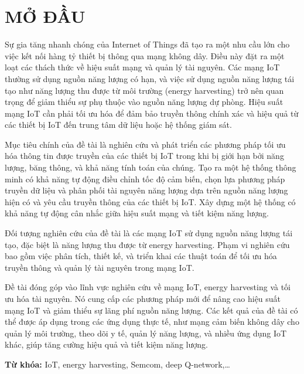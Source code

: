\section*{MỞ ĐẦU}
Sự gia tăng nhanh chóng của Internet of Things đã tạo ra một nhu cầu lớn cho việc kết nối hàng tỷ thiết bị thông qua mạng không dây. Điều này đặt ra một loạt các thách thức về hiệu suất mạng và quản lý tài nguyên. Các mạng IoT thường sử dụng nguồn năng lượng có hạn, và việc sử dụng nguồn năng lượng tái tạo như năng lượng thu được từ môi trường (energy harvesting) trở nên quan trọng để giảm thiểu sự phụ thuộc vào nguồn năng lượng dự phòng. Hiệu suất mạng IoT cần phải tối ưu hóa để đảm bảo truyền thông chính xác và hiệu quả từ các thiết bị IoT đến trung tâm dữ liệu hoặc hệ thống giám sát.

Mục tiêu chính của đề tài là nghiên cứu và phát triển các phương pháp tối ưu hóa thông tin được truyền của các thiết bị IoT trong khi bị giới hạn bởi năng lượng, băng thông, và khả năng tính toán của chúng. Tạo ra một hệ thống thông minh có khả năng tự động điều chỉnh tốc độ cảm biến, chọn lựa phương pháp truyền dữ liệu và phân phối tài nguyên năng lượng dựa trên nguồn năng lượng hiện có và yêu cầu truyền thông của các thiết bị IoT. Xây dựng một hệ thống có khả năng tự động cân nhắc giữa hiệu suất mạng và tiết kiệm năng lượng.

Đối tượng nghiên cứu của đề tài là các mạng IoT sử dụng nguồn năng lượng tái tạo, đặc biệt là năng lượng thu được từ energy harvesting. Phạm vi nghiên cứu bao gồm việc phân tích, thiết kế, và triển khai các thuật toán để tối ưu hóa truyền thông và quản lý tài nguyên trong mạng IoT.

Đề tài đóng góp vào lĩnh vực nghiên cứu về mạng IoT, energy harvesting và tối ưu hóa tài nguyên. Nó cung cấp các phương pháp mới để nâng cao hiệu suất mạng IoT và giảm thiểu sự lãng phí nguồn năng lượng. Các kết quả của đề tài có thể được áp dụng trong các ứng dụng thực tế, như mạng cảm biến không dây cho quản lý môi trường, theo dõi y tế, quản lý năng lượng, và nhiều ứng dụng IoT khác, giúp tăng cường hiệu quả và tiết kiệm năng lượng.


\textbf{Từ khóa: }IoT, energy harvesting, Semcom, deep Q-network,…
\cleardoublepage